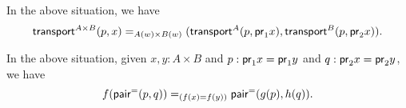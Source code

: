 \documentclass[hott-all.tex]{subfiles}
\begin{document}
%
%
\begin{thm}\label{thm:trans-prod}
  In the above situation, we have
  \[
  \id[A(w) \times B(w)]
  {\transfib{A\times B}px}
  {(\transfib{A}{p}{\proj{1}x}, \transfib{B}{p}{\proj{2}x})}.
  \]
\end{thm}
%
%
\begin{thm}\label{thm:ap-prod}
  In the above situation, given $x,y:A\times B$ and $p:\proj1x=\proj1y$ and $q:\proj2x=\proj2y$, we have
  \[ \id[(f(x)=f(y))]{\ap{f}{\pairpath(p,q)}} {\pairpath(\ap{g}{p},\ap{h}{q})}. \]
\end{thm}
%
%
%
\end{document}
